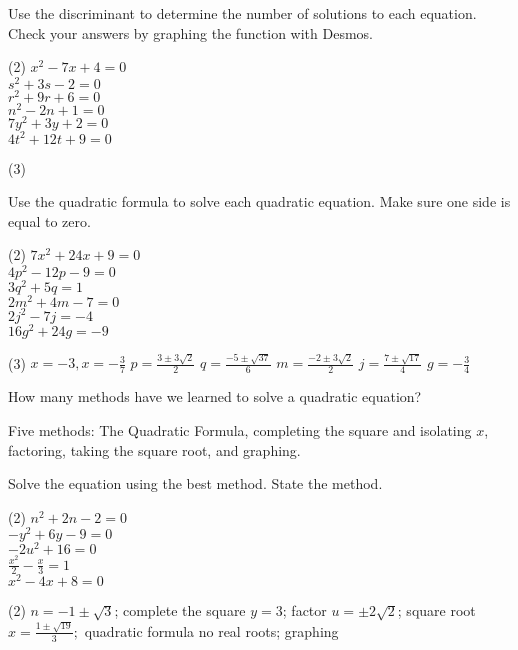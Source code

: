 \documentclass[12pt,fleqn]{book}
\newcommand{\prb}[1]{\begin{Exercise}#1\end{Exercise}}
\newcommand{\sol}[1]{\begin{Answer}#1\end{Answer}}
\begin{document}
\prb{Use the discriminant to determine the
	number of solutions to each equation.  Check your answers by graphing the function with Desmos.
	\begin{tasks}(2)
		\task $x^2-7 x+4=0$ \\[3em]
		\task $s^2+3 s-2=0$ \\[3em]
		\task $r^2+9 r+6=0$ \\[3em]
		\task $n^2-2 n+1=0$ \\[3em]
		\task $7 y^2+3 y+2=0$ \\[3em]
		\task $4 t^2+12 t+9=0$ \\[3em]
	\end{tasks}
}

\sol{
	\begin{tasks}(3)
		\task 2
		\task 2
		\task 0
		\task 1
	\end{tasks}
}
\clearpage
\prb{Use the quadratic formula to solve each
	quadratic equation.  Make sure one side is equal to zero.
	\begin{tasks}(2)
		\task $7 x^2+24 x+9=0$\\[5em]
		\task $4 p^2-12 p-9=0$\\[5em]
		\task $3 q^2+5 q=1$\\[5em]
		\task $2 m^2+4 m-7=0$\\[5em]
		\task $2 j^2-7 j=-4$\\[5em]
		\task $16 g^2+24 g=-9$\\[5em]
	\end{tasks}
}

\sol{
	\begin{tasks}(3)
		\task $x=-3, x=-\frac{3}{7}$
		\task $p=\frac{3 \pm 3 \sqrt{2}}{2}$
		\task $q=\frac{-5 \pm \sqrt{37}}{6}$
		\task $m=\frac{-2 \pm 3 \sqrt{2}}{2}$
		\task $j=\frac{7 \pm \sqrt{17}}{4}$
		\task $g=-\frac{3}{4}$
	\end{tasks}
}

\prb{How many methods have we learned to solve a quadratic equation?\\[4em]}
\sol{Five methods: The Quadratic Formula, completing the square and isolating $x$, factoring, taking the square root, and graphing.}

\prb{Solve the equation using the best method.  State the method.
	\begin{tasks}(2)
		\task $n^2+2 n-2=0$
		\\[8em]
		\task $-y^2+6 y-9=0$
		\\[8em]
		\task $-2 u^2+16=0$
		\\[8em]
		\task $\frac{x^2}{2}-\frac{x}{3}=1$
		\\[8em]
		\task $x^2-4 x+8=0$
		\\[8em]
	\end{tasks}
}
\sol{
	\begin{tasks}(2)
		\task $n=-1 \pm \sqrt{3}$; complete the square
		\task $y=3$; factor
		\task $u=\pm 2 \sqrt{2}$; square root
		\task $x=\frac{1 \pm \sqrt{19}}{3} ;$ quadratic formula
		\task no real roots; graphing
	\end{tasks}
}
\end{document}
